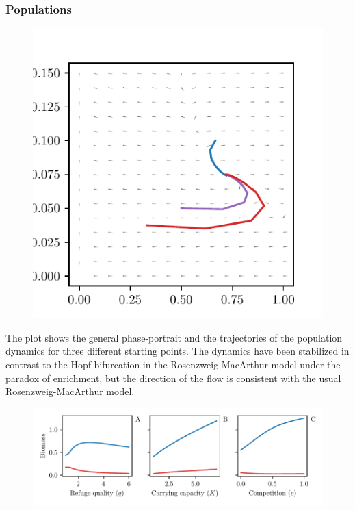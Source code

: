 \subsubsection*{Populations}
\begin{figure}[H]
  \begin{centering}
    \includegraphics{plots/dynamics.pdf}
  \end{centering}
  \label{fig:dynamics}
\end{figure}
The plot  shows the general phase-portrait and the trajectories of the population dynamics for three different starting points. The dynamics have been stabilized in contrast to the Hopf  bifurcation in the Rosenzweig-MacArthur model under the paradox of enrichment, but the direction of the flow is consistent with the usual Rosenzweig-MacArthur model.
\begin{figure}[H]
  \begin{centering}
    \includegraphics{plots/pop_levels_c.pdf}
  \end{centering}
  \label{fig:pop_levels}
\end{figure}
